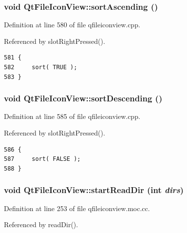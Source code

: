 \subsubsection{\setlength{\rightskip}{0pt plus 5cm}void Qt\-File\-Icon\-View::sort\-Ascending ()\hspace{0.3cm}{\tt  [protected, slot]}}\label{classQtFileIconView_QtFileIconViewj11}




Definition at line 580 of file qfileiconview.cpp.

Referenced by slot\-Right\-Pressed().



\footnotesize\begin{verbatim}581 {
582     sort( TRUE );
583 }
\end{verbatim}\normalsize 
{}
\subsubsection{\setlength{\rightskip}{0pt plus 5cm}void Qt\-File\-Icon\-View::sort\-Descending ()\hspace{0.3cm}{\tt  [protected, slot]}}\label{classQtFileIconView_QtFileIconViewj12}




Definition at line 585 of file qfileiconview.cpp.

Referenced by slot\-Right\-Pressed().



\footnotesize\begin{verbatim}586 {
587     sort( FALSE );
588 }
\end{verbatim}\normalsize 
{}
\subsubsection{\setlength{\rightskip}{0pt plus 5cm}void Qt\-File\-Icon\-View::start\-Read\-Dir (int {\em dirs})\hspace{0.3cm}{\tt  [signal]}}\label{classQtFileIconView_QtFileIconViewl1}




Definition at line 253 of file qfileiconview.moc.cc.

Referenced by read\-Dir().



